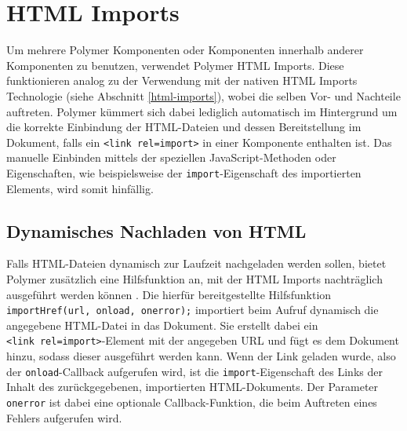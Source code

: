 


\newpage
\section{HTML Imports}\label{polymer-html-imports}

Um mehrere Polymer Komponenten oder Komponenten innerhalb anderer Komponenten zu benutzen, verwendet Polymer \ac{HTML} Imports. Diese funktionieren analog zu der Verwendung mit der nativen \ac{HTML} Imports Technologie (siehe Abschnitt \ref{html-imports}), wobei die selben Vor- und Nachteile auftreten. Polymer kümmert sich dabei lediglich automatisch im Hintergrund um die korrekte Einbindung der \ac{HTML}-Dateien und dessen Bereitstellung im Dokument, falls ein \texttt{\textless{}link\ rel=\dq import\dq\textgreater{}} in einer Komponente enthalten ist. Das manuelle Einbinden mittels der speziellen JavaScript-Methoden oder Eigenschaften, wie beispielsweise der \texttt{import}-Eigenschaft des importierten Elements, wird somit hinfällig.

\subsection{Dynamisches Nachladen von HTML}\label{dynamisches-nachladen-von-html}

Falls \ac{HTML}-Dateien dynamisch zur Laufzeit nachgeladen werden sollen, bietet Polymer zusätzlich eine Hilfsfunktion an, mit der \ac{HTML} Imports nachträglich ausgeführt werden können \cite{citeulike:13914840}. Die hierfür bereitgestellte Hilfsfunktion \texttt{importHref(url,\ onload,\ onerror);} importiert beim Aufruf dynamisch die angegebene \ac{HTML}-Datei in das Dokument. Sie erstellt dabei ein \texttt{\textless{}link\ rel=\dq import\dq\textgreater{}}-Element mit der angegeben URL und fügt es dem Dokument hinzu, sodass dieser ausgeführt werden kann. Wenn der Link geladen wurde, also der \texttt{onload}-Callback aufgerufen wird, ist die \texttt{import}-Eigenschaft des Links der Inhalt des zurückgegebenen, importierten \ac{HTML}-Dokuments. Der Parameter \texttt{onerror} ist dabei eine optionale Callback-Funktion, die beim Auftreten eines Fehlers aufgerufen wird.
